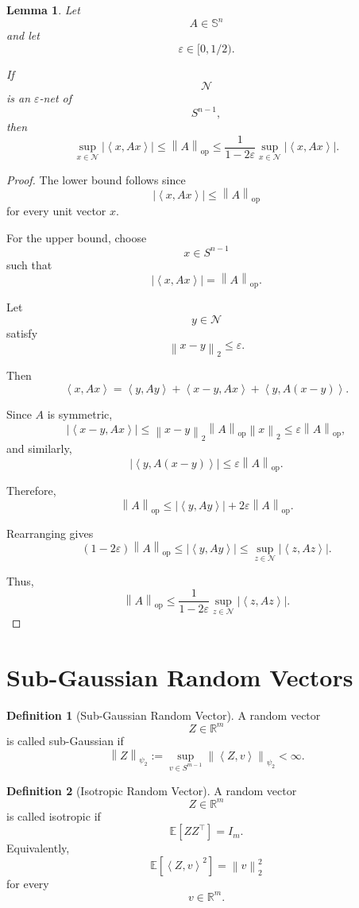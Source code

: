\documentclass[12pt,oneside]{book}
\numberwithin{equation}{section}
\theoremstyle{definition}
\newtheorem{definition}{Definition}[section]
\theoremstyle{plain}
\newtheorem{lemma}{Lemma}[section]
\theoremstyle{remark}
\newcommand{\R}{\mathbb{R}}
\newcommand{\E}{\mathbb{E}}
\newcommand{\norm}[1]{\left\lVert #1 \right\rVert}
\newcommand{\inner}[2]{\left\langle #1, #2 \right\rangle}
\begin{document}
\begin{lemma}
Let
\[
A\in\mathbb{S}^n
\]
and let
\[
\varepsilon\in[0,1/2).
\]

If
\[
\mathcal{N}
\]
is an $\varepsilon$-net of
\[
S^{n-1},
\]
then
\[
\sup_{x\in\mathcal{N}}|\inner{x}{Ax}|
\leq
\norm{A}_{\mathrm{op}}
\leq
\frac{1}{1-2\varepsilon}
\sup_{x\in\mathcal{N}}|\inner{x}{Ax}|.
\]
\end{lemma}

\begin{proof}
The lower bound follows since
\[
|\inner{x}{Ax}|
\leq
\norm{A}_{\mathrm{op}}
\]
for every unit vector $x$.

For the upper bound, choose
\[
x\in S^{n-1}
\]
such that
\[
|\inner{x}{Ax}|
=
\norm{A}_{\mathrm{op}}.
\]

Let
\[
y\in\mathcal{N}
\]
satisfy
\[
\norm{x-y}_2\leq \varepsilon.
\]

Then
\[
\inner{x}{Ax}
=
\inner{y}{Ay}
+
\inner{x-y}{Ax}
+
\inner{y}{A(x-y)}.
\]

Since $A$ is symmetric,
\[
|\inner{x-y}{Ax}|
\leq
\norm{x-y}_2\norm{A}_{\mathrm{op}}\norm{x}_2
\leq
\varepsilon\norm{A}_{\mathrm{op}},
\]
and similarly,
\[
|\inner{y}{A(x-y)}|
\leq
\varepsilon\norm{A}_{\mathrm{op}}.
\]

Therefore,
\[
\norm{A}_{\mathrm{op}}
\leq
|\inner{y}{Ay}|
+
2\varepsilon\norm{A}_{\mathrm{op}}.
\]

Rearranging gives
\[
(1-2\varepsilon)\norm{A}_{\mathrm{op}}
\leq
|\inner{y}{Ay}|
\leq
\sup_{z\in\mathcal{N}}|\inner{z}{Az}|.
\]

Thus,
\[
\norm{A}_{\mathrm{op}}
\leq
\frac{1}{1-2\varepsilon}
\sup_{z\in\mathcal{N}}|\inner{z}{Az}|.
\]
\end{proof}

\section{Sub-Gaussian Random Vectors}

\begin{definition}[Sub-Gaussian Random Vector]
A random vector
\[
Z\in\R^m
\]
is called sub-Gaussian if
\[
\norm{Z}_{\psi_2}
:=
\sup_{v\in S^{m-1}}
\norm{\inner{Z}{v}}_{\psi_2}
<\infty.
\]
\end{definition}

\begin{definition}[Isotropic Random Vector]
A random vector
\[
Z\in\R^m
\]
is called isotropic if
\[
\E[ZZ^\top]=I_m.
\]
Equivalently,
\[
\E[\inner{Z}{v}^2]=\norm{v}_2^2
\]
for every
\[
v\in\R^m.
\]
\end{definition}
\end{document}
